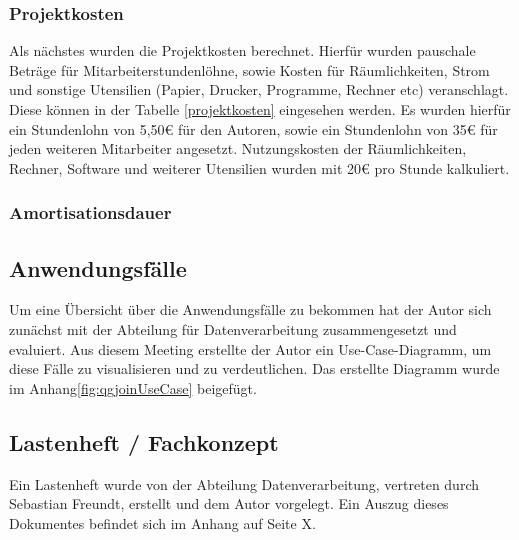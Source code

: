 \subsubsection{Projektkosten}
Als nächstes wurden die Projektkosten berechnet. Hierfür wurden pauschale Beträge 
für Mitarbeiterstundenlöhne, sowie Kosten für Räumlichkeiten, Strom und sonstige Utensilien 
(Papier, Drucker, Programme, Rechner etc) veranschlagt. Diese können in der Tabelle 
\ref{projektkosten} eingesehen werden. Es wurden hierfür ein Stundenlohn von 5,50€ für den 
Autoren, sowie ein Stundenlohn von 35€ für jeden weiteren Mitarbeiter angesetzt. Nutzungskosten 
der Räumlichkeiten, Rechner, Software und weiterer Utensilien wurden mit 20€ pro Stunde kalkuliert. \par


\subsubsection{Amortisationsdauer}


\subsection{Anwendungsfälle}
Um eine Übersicht über die Anwendungsfälle zu bekommen hat der Autor sich zunächst mit der Abteilung für Datenverarbeitung zusammengesetzt und evaluiert. Aus diesem Meeting erstellte der Autor ein Use-Case-Diagramm, um diese Fälle zu visualisieren und zu verdeutlichen. Das erstellte Diagramm wurde
im Anhang\ref{fig:qgjoinUseCase} beigefügt.


\subsection{Lastenheft / Fachkonzept}
Ein Lastenheft wurde von der Abteilung Datenverarbeitung, vertreten durch Sebastian Freundt,
erstellt und dem Autor vorgelegt. Ein Auszug dieses Dokumentes befindet sich im Anhang auf Seite X.\par




\clearpage